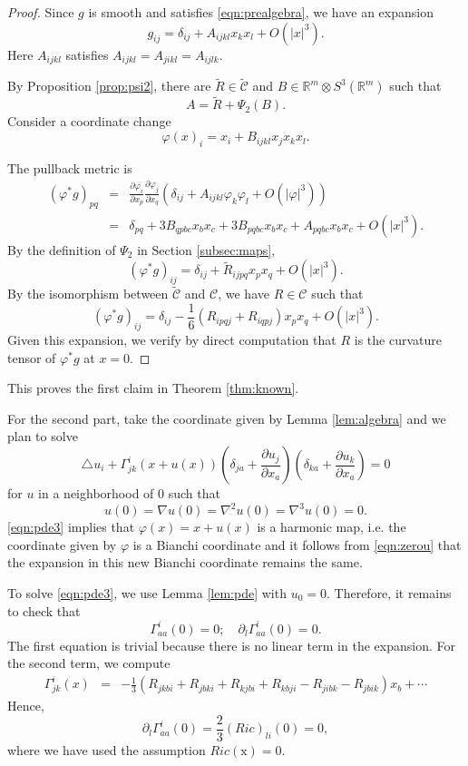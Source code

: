 \documentclass{amsart}
\newcommand{\abs}[1]{\left\vert#1\right\vert}
\newcommand{\Real}{\mathbb R}
\newcommand{\pfrac}[2]{\frac{\partial #1}{\partial #2}}
\newcommand{\bx}{\mathrm{x}}
\numberwithin{equation}{section}
\begin{document}
\begin{proof}
	Since $g$ is smooth and satisfies \eqref{eqn:prealgebra}, we have an expansion
	\[
		g_{ij}=\delta_{ij}+A_{ijkl}x_kx_l +O(\abs{x}^3).
	\]
	Here $A_{ijkl}$ satisfies $A_{ijkl}=A_{jikl}=A_{ijlk}$.

	By Proposition \ref{prop:psi2}, there are $\tilde{R}\in \tilde{\mathcal C}$ and $B\in \Real^m\otimes S^3(\Real^m)$ such that
	\[
		A= \tilde{R}+ \Psi_2(B).
	\]
	Consider a coordinate change
	\[
		\varphi(x)_i= x_i + B_{ijkl}x_jx_kx_l.
	\]

	The pullback metric is
	\begin{eqnarray*}
		(\varphi^* g)_{pq}&=& \pfrac{\varphi_i}{x_p}\pfrac{\varphi_j}{x_q} \left( \delta_{ij}+A_{ijkl}\varphi_k\varphi_l + O(\abs{\varphi}^3) \right) \\
				  &=& \delta_{pq} + 3B_{qpbc}x_bx_c+ 3B_{pqbc}x_bx_c + A_{pqbc}x_bx_c + O(\abs{x}^3).
	\end{eqnarray*}
	By the definition of $\Psi_2$ in Section \ref{subsec:maps}, 
	\[
		(\varphi^* g)_{ij} = \delta_{ij} + \tilde{R}_{ijpq} x_px_q + O(\abs{x}^3).
	\]
	By the isomorphism between $\tilde{\mathcal C}$ and $\mathcal C$, we have $R\in \mathcal C$ such that
	\[
		(\varphi^* g)_{ij} = \delta_{ij} -\frac{1}{6} (R_{ipqj}+R_{iqpj})x_px_q + O(\abs{x}^3).
	\]
	Given this expansion, we verify by direct computation that $R$ is the curvature tensor of $\varphi^* g$ at $x=0$.
\end{proof}
This proves the first claim in Theorem \ref{thm:known}. 

For the second part, take the coordinate given by Lemma \ref{lem:algebra} and we plan to solve
\begin{equation}
	\label{eqn:pde3}
	\triangle u_i + \Gamma^i_{jk}(x+u(x)) \left( \delta_{ja} + \pfrac{u_j}{x_a} \right)\left( \delta_{ka}+\pfrac{u_k}{x_a} \right)=0
\end{equation}
for $u$ in a neighborhood of $0$ such that
\begin{equation}
	\label{eqn:zerou}
	u(0)= \nabla u(0) = \nabla^2 u(0) = \nabla^3 u(0) =0.
\end{equation}
\eqref{eqn:pde3} implies that $\varphi(x)=x+u(x)$ is a harmonic map, i.e. the coordinate given by $\varphi$ is a Bianchi coordinate and it follows from \eqref{eqn:zerou} that the expansion in this new Bianchi  coordinate remains the same.

To solve \eqref{eqn:pde3}, we use Lemma \ref{lem:pde} with $u_0=0$. Therefore, it remains to check that
\[
	\Gamma^i_{aa}(0)=0; \quad \partial_l \Gamma^i_{aa}(0)=0.
\]
The first equation is trivial because there is no linear term in the expansion. For the second term, we compute
\begin{eqnarray*}
	\Gamma^i_{jk}(x)&=& -\frac{1}{3}\left( R_{jkbi} + R_{jbki} + R_{kjbi}+R_{kbji}-R_{jibk}-R_{jbik} \right) x_b + \cdots 
\end{eqnarray*}
Hence,
\[
	\partial_{l}\Gamma^i_{aa} (0)= \frac{2}{3} (Ric)_{li}(0)=0,
\]
where we have used the assumption $Ric(\bx)=0$.
\end{document}

